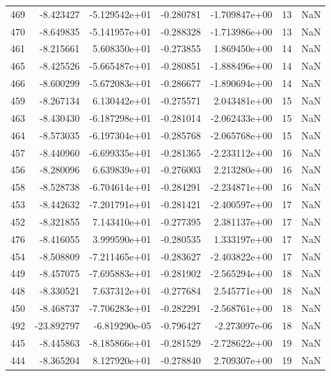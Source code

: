 \begin{tabular}{rrrrrrr}
 469 &  -8.423427 & -5.129542e+01 & -0.280781 & -1.709847e+00 &          13 & NaN \\
 470 &  -8.649835 & -5.141957e+01 & -0.288328 & -1.713986e+00 &          13 & NaN \\
 461 &  -8.215661 &  5.608350e+01 & -0.273855 &  1.869450e+00 &          14 & NaN \\
 465 &  -8.425526 & -5.665487e+01 & -0.280851 & -1.888496e+00 &          14 & NaN \\
 466 &  -8.600299 & -5.672083e+01 & -0.286677 & -1.890694e+00 &          14 & NaN \\
 459 &  -8.267134 &  6.130442e+01 & -0.275571 &  2.043481e+00 &          15 & NaN \\
 463 &  -8.430430 & -6.187298e+01 & -0.281014 & -2.062433e+00 &          15 & NaN \\
 464 &  -8.573035 & -6.197304e+01 & -0.285768 & -2.065768e+00 &          15 & NaN \\
 457 &  -8.440960 & -6.699335e+01 & -0.281365 & -2.233112e+00 &          16 & NaN \\
 456 &  -8.280096 &  6.639839e+01 & -0.276003 &  2.213280e+00 &          16 & NaN \\
 458 &  -8.528738 & -6.704614e+01 & -0.284291 & -2.234871e+00 &          16 & NaN \\
 453 &  -8.442632 & -7.201791e+01 & -0.281421 & -2.400597e+00 &          17 & NaN \\
 452 &  -8.321855 &  7.143410e+01 & -0.277395 &  2.381137e+00 &          17 & NaN \\
 476 &  -8.416055 &  3.999590e+01 & -0.280535 &  1.333197e+00 &          17 & NaN \\
 454 &  -8.508809 & -7.211465e+01 & -0.283627 & -2.403822e+00 &          17 & NaN \\
 449 &  -8.457075 & -7.695883e+01 & -0.281902 & -2.565294e+00 &          18 & NaN \\
 448 &  -8.330521 &  7.637312e+01 & -0.277684 &  2.545771e+00 &          18 & NaN \\
 450 &  -8.468737 & -7.706283e+01 & -0.282291 & -2.568761e+00 &          18 & NaN \\
 492 & -23.892797 & -6.819290e-05 & -0.796427 & -2.273097e-06 &          18 & NaN \\
 445 &  -8.445863 & -8.185866e+01 & -0.281529 & -2.728622e+00 &          19 & NaN \\
 444 &  -8.365204 &  8.127920e+01 & -0.278840 &  2.709307e+00 &          19 & NaN \\

\end{tabular}
